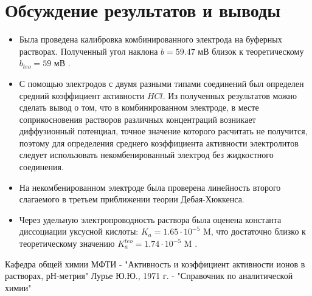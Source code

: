 \documentclass[a4paper,12pt]{article}
\begin{document}
\section{Обсуждение результатов и выводы}
\begin{itemize}
\item  Была проведена калибровка комбинированного электрода на буферных растворах. Полученный угол наклона  $b = 59.47 \text{ мВ}$  близок к теоретическому $b_{teo} = 59\text{ мВ}$ .
\item   С помощью электродов с двумя разными типами соединений был определен средний коэффициент активности $HCl$. Из полученных результатов можно сделать вывод о том, что в комбинированном электроде, в месте соприкосновения растворов различных концентраций возникает диффузионный потенциал, точное значение которого расчитать не получится, поэтому для определения среднего коэффициента активности электролитов следует использовать некомбенированный электрод без
жидкостного соединения.

\item На некомбенированном электроде была проверена линейность второго слагаемого в третьем приближении теории Дебая-Хюккенса. 

\item Через удельную электропроводность раствора была оценена константа диссоциации уксусной  кислоты:   $K_{a} = 1.65 \cdot 10^{-5} \text{ M}$, что достаточно близко к теоретическому значению  $K_{a}^{teo} = 1.74 \cdot 10^{-5} \text{ M}$ \cite{3}.

\end{itemize}


\newpage

\begin{thebibliography}{}
      Кафедра общей химии МФТИ -  "Активность и коэффициент активности ионов в растворах, рН-метрия"
      Лурье Ю.Ю., 1971 г.  -  "Справочник по аналитической химии"
\end{thebibliography}
\end{document}
